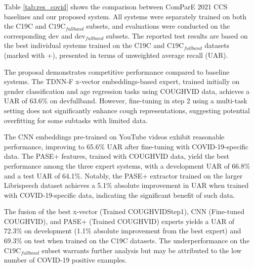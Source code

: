   Table \ref{tab:res_covid} shows the comparison between ComParE 2021 CCS baselines and our proposed system. All systems were separately trained on both the C19C and $\text{C19C}_{fullband}$ subsets, and evaluations were conducted on the corresponding dev and $\text{dev}_{fullband}$ subsets. The reported test results are based on the best individual systems trained on the C19C and $\text{C19C}_{fullband}$ datasets (marked with +), presented in terms of unweighted average recall (UAR).

  The proposal demonstrates competitive performance compared to baseline systems. The TDNN-F x-vector embeddings-based expert, trained initially on gender classification and age regression tasks using COUGHVID data, achieves a UAR of 63.6\% on devfullband. However, fine-tuning in step 2 using a multi-task setting does not significantly enhance cough representations, suggesting potential overfitting for some subtasks with limited data.
  
  The CNN embeddings pre-trained on YouTube videos exhibit reasonable performance, improving to 65.6\% UAR after fine-tuning with COVID-19-specific data. The PASE+ features, trained with COUGHVID data, yield the best performance among the three expert systems, with a development UAR of 66.8\% and a test UAR of 64.1\%. Notably, the PASE+ extractor trained on the larger Librispeech dataset achieves a 5.1\% absolute improvement in UAR when trained with COVID-19-specific data, indicating the significant benefit of such data.
  
  The fusion of the best x-vector (Trained COUGHVIDStep1), CNN (Fine-tuned COUGHVID), and PASE+ (Trained COUGHVID) experts yields a UAR of 72.3\% on development (1.1\% absolute improvement from the best expert) and 69.3\% on test when trained on the C19C datasets. The underperformance on the $\text{C19C}_{fullband}$ subset warrants further analysis but may be attributed to the low number of COVID-19 positive examples.


